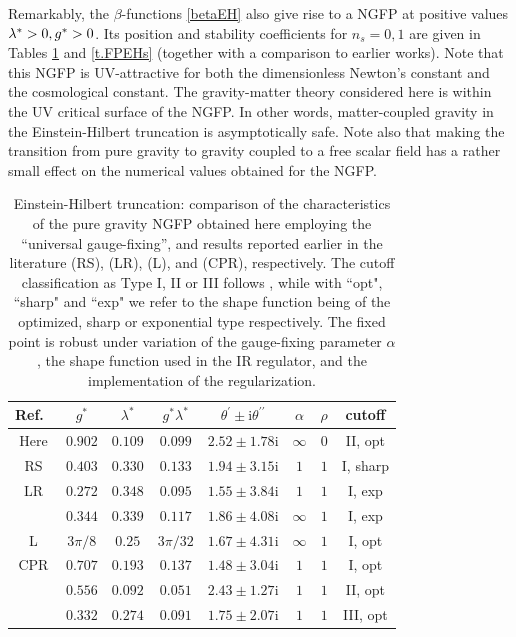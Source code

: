 \documentclass[preprint,preprintnumbers,amsmath,amssymb,nofootinbib,APS]{revtex4}
\newcommand{\2}{\sqrt{2\,}}
\newcommand{\I}{\mathrm{i}}
\begin{document}
Remarkably, the $\beta$-functions \eqref{betaEH} also give rise to a NGFP at positive values $\lambda^*>0, g^* > 0$. Its position and stability coefficients for $n_s=0,1$ are given in Tables \ref{t.FPEH} and \ref{t.FPEHs} (together with a comparison to earlier works). Note that this NGFP is UV-attractive for both the dimensionless Newton's constant and the cosmological constant. The gravity-matter theory considered here is within the UV critical surface of the NGFP. In other words, matter-coupled gravity in the Einstein-Hilbert truncation is asymptotically safe. Note also that making the transition from pure gravity to gravity coupled to a free scalar field has a rather small effect on the numerical values obtained for the NGFP.  

\begin{table}[t!]
\begin{center}
\begin{tabular}{|c|cc|c|c||cc|c|}\hline
Ref.\ & \; \; \; $g^*$ \; \; \; & \; \; \; $\lambda^*$ \; \; \; & \; \; \; $g^* \lambda^*$ \; \; \; & \; \; \; $\theta^\prime \pm \I \theta^{\prime \prime}$ \; \; \; & \; \; \; $\alpha$ \; \; \; & \; \; \; $\rho$ \; \; \; & \; \; \; cutoff \; \; \; \\ \hline
%
Here & $0.902$ & $0.109$ & $0.099$ & $2.52 \pm 1.78 \I$ & $\infty$ & $0$ & II, opt 
\\ \hline
%
RS & $0.403$ & $0.330$ & $0.133$ & $1.94 \pm 3.15\I$ & $1$ & $1$ & I, sharp
\\ \hline
LR & $0.272$ & $0.348$ & $0.095$ & $1.55 \pm 3.84\I$ & $1$ & $1$ & I, exp \\
& $0.344$ & $0.339$ & $0.117$ & $1.86 \pm 4.08\I$ & $\infty$ & $1$ & I, exp  
\\ \hline
%
L & $3 \pi/8$ & $0.25$ & $3 \pi/32$ & $1.67 \pm 4.31 \I $ & $\infty$ & $1$ & I, opt\\ \hline
CPR & $0.707$ & $0.193$ & $0.137$ & $1.48 \pm 3.04\I$ & $1$ & $1$ & I, opt \\ 
& $0.556$ & $0.092$ & $0.051$ & $2.43 \pm 1.27 \I$ & $1$ &$1$ & II, opt \\
& $0.332$ & $0.274$ & $0.091$ & $1.75 \pm 2.07\I$ & $1$ & $1$ & III, opt \\ \hline
%
\end{tabular}
\parbox[c]{\textwidth}{\caption{\label{t.FPEH}{Einstein-Hilbert truncation: comparison of the characteristics of the pure gravity NGFP obtained here employing the ``universal gauge-fixing'', and results reported earlier in the literature \cite{Reuter:2001ag} (RS), \cite{Lauscher:2001ya} (LR), \cite{Litim:2003vp} (L), and \cite{Codello:2008vh} (CPR), respectively. The cutoff classification as Type I, II or III follows \cite{Codello:2008vh}, while with ``opt", ``sharp" and ``exp" we refer to the shape function being of the optimized, sharp or exponential type respectively. The fixed point is robust under variation of the gauge-fixing parameter $\alpha$, the shape function used in the IR regulator, and the implementation of the regularization.}}}
\end{center}
\end{table}
\end{document}
